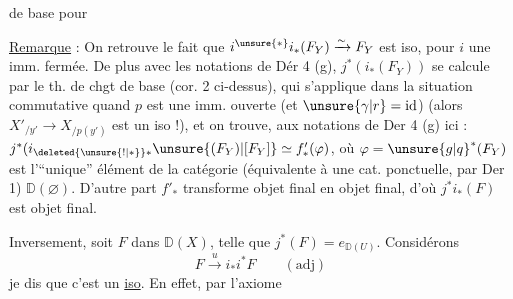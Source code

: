  de base pour
\diagram{\begin{tikzcd}[ampersand replacement=\&]
 Z'\arrow[r,"p"]\arrow[d,"f'"'] \& Z\rlap{$\;F$}\arrow[d,"f"]\\
 S\arrow[r,"\mathrm{id}"]\&S
\end{tikzcd}\quad $.\quad\big]$}

\uline{Remarque} : On retrouve le fait que $i^{\unsure{*}}i_*(F_Y)\xrightarrow{\sim}F_Y$ est iso, pour $i$ une imm. fermée.  De plus avec les notations de Dér 4 (g),   $j^*(i_*(F_Y))$ se calcule par le th. de chgt de base (cor. 2 ci-dessus), qui s'applique dans la situation commutative
quand $p$ est une imm. ouverte (et $\unsure{\gamma|r}=\mathrm{id}$) (alors $X'_{/y'}\to X_{/p(y')}$ est \unsure{$=$} un iso !), et on trouve,  aux notations de Der 4 (g)
ici : $j^*(i_{\deleted{\unsure{!|*}}*}\unsure{(F_Y)|[F_Y]}\simeq f'_*(\varphi)$, où $\varphi=\unsure{g|q}^*(F_Y)$ est l'``unique'' élément de la catégorie (équivalente à une cat. ponctuelle, par Der 1) $\mathbb D(\varnothing)$. D'autre part $f'_*$ transforme objet final en objet final, d'où $j^*i_*(F)$ est objet final.

Inversement, soit $F$ dans $\mathbb D(X)$, telle que $j^*(F)=e_{\mathbb D(U)}$. Considérons
\[
 F\xrightarrow{u}i_*i^*F\qquad(\mathrm{adj})
\]
je dis que c'est un \uline{iso}. En effet, par l'axiome
